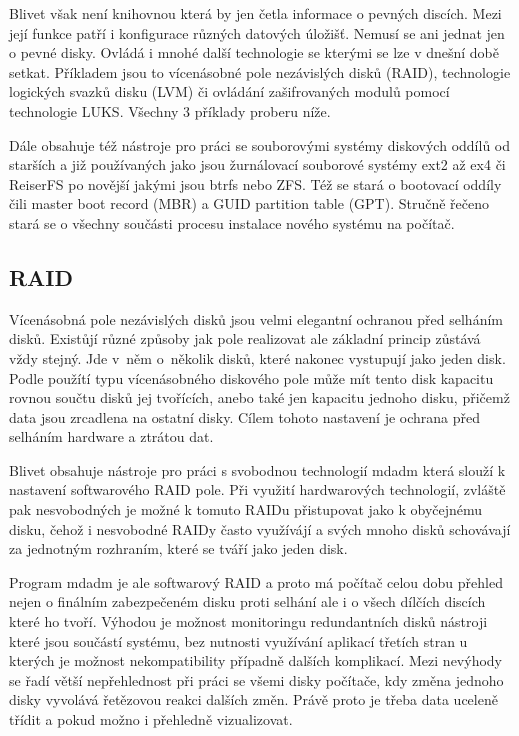 \documentclass[color,table,oneside,nolot,nolof]{fithesis}
\begin{document}
	Blivet však není knihovnou která by jen četla informace o pevných discích. Mezi její funkce patří i konfigurace různých datových úložišť. Nemusí se ani jednat jen o pevné disky.
	Ovládá i mnohé další technologie se kterými se lze v dnešní době setkat. Příkladem jsou to vícenásobné pole nezávislých disků (RAID), technologie logických svazků disku (LVM) či 
	ovládání zašifrovaných modulů pomocí technologie LUKS. Všechny 3 příklady proberu níže.

	Dále obsahuje též nástroje pro práci se souborovými systémy diskových oddílů od starších a již používaných jako jsou žurnálovací souborové systémy ext2 až ex4 či ReiserFS po novější
	jakými jsou btrfs nebo ZFS. Též se stará o bootovací oddíly čili master boot record (MBR) a GUID partition table (GPT). Stručně řečeno stará se o všechny součásti procesu instalace
	nového systému na počítač.

\subsection{RAID}
	Vícenásobná pole nezávislých disků jsou velmi elegantní ochranou před selháním disků. Existůjí různé způsoby jak pole realizovat ale základní princip zůstává vždy stejný. Jde v~něm
	o~několik disků, které nakonec vystupují jako jeden disk. Podle použítí typu vícenásobného diskového pole může mít tento disk kapacitu rovnou součtu disků jej tvořících, anebo také
	jen kapacitu jednoho disku, přičemž data jsou zrcadlena na ostatní disky. Cílem tohoto nastavení je ochrana před selháním hardware a ztrátou dat. 
	
	Blivet obsahuje nástroje pro práci s svobodnou technologií mdadm která slouží k nastavení softwarového RAID pole. Při využití hardwarových technologií, zvláště pak nesvobodných
	je možné k tomuto RAIDu přistupovat jako k obyčejnému disku, čehož i nesvobodné RAIDy často využívájí a svých mnoho disků schovávají za jednotným rozhraním, které se tváří jako jeden
	disk. 

	Program mdadm je ale softwarový RAID a proto má počítač celou dobu přehled nejen o finálním zabezpečeném disku proti selhání ale i o všech dílčích discích které ho tvoří. Výhodou je
	možnost monitoringu redundantních disků nástroji které jsou součástí systému, bez nutnosti využívání aplikací třetích stran u kterých je možnost nekompatibility případně dalších 
	komplikací.
	Mezi nevýhody se řadí větší nepřehlednost při práci se všemi disky počítače, kdy změna jednoho disky vyvolává řetězovou reakci dalších změn. Právě proto je třeba data uceleně třídit
	a pokud možno i přehledně vizualizovat.
\end{document}
